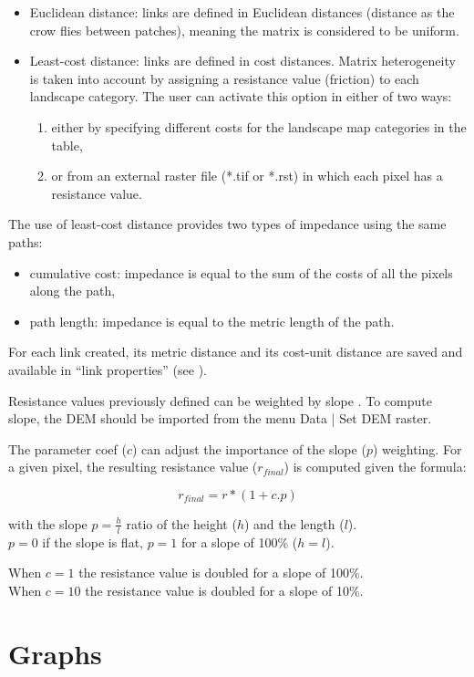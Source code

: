 \documentclass{article}
\begin{document}
\begin{itemize}
	\item Euclidean distance: links are defined in Euclidean distances (distance as the crow flies between patches), meaning the matrix is considered to be uniform.
	\item Least-cost distance: links are defined in cost distances. Matrix heterogeneity is taken into account by assigning a resistance value (friction) to each landscape category. The user can activate this option in either of two ways:
	\begin{enumerate}
		\item either by specifying different costs for the landscape map categories in the table,
		\item or from an external raster file (*.tif or *.rst) in which each pixel has a resistance value.
	\end{enumerate}
\end{itemize}


The use of least-cost distance provides two types of impedance using the same paths:
\begin{itemize}
	\item cumulative cost: impedance is equal to the sum of the costs of all the pixels along the path,
	\item path length: impedance is equal to the metric length of the path.
\end{itemize}
For each link created, its metric distance and its cost-unit distance are saved and available in “link properties” (see ). 

Resistance values previously defined can be weighted by slope \cite{2015_monkey}. To compute slope, the DEM should be imported from the menu Data | Set DEM raster. 

The parameter coef ($c$) can adjust the importance of the slope ($p$) weighting. For a given pixel, the resulting resistance value ($r_{final}$) is computed given the formula:  

$$r_{final} = r * (1 + c.p)$$

with the slope $p=\frac{h}{l}$ ratio of the height ($h$) and the length ($l$).\\ 
$p=0$ if the slope is flat, $p=1$ for a slope of 100\% ($h=l$).

When $c=1$ the resistance value is doubled for a slope of 100\%.\\
When $c=10$ the resistance value is doubled for a slope of 10\%.

\section{Graphs}
\end{document}

